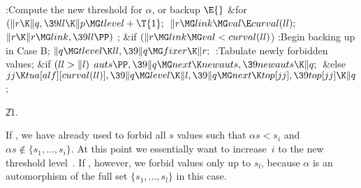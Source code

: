 \B{}:Compute the new threshold for $\alpha$, or backup%
\X${}\E{}$\6
\&{for} ${}(\|r\K\|q,\39\\{ll}\K\|p\MG\\{tlevel}+\T{1};{}$ ${}\|r\MG\\{link}\MG%
\\{val}\E\\{curval}(\\{ll});{}$ ${}\|r\K\|r\MG\\{link},\39\\{ll}\PP){}$\1\5
;\2\6
\&{if} ${}(\|r\MG\\{link}\MG\\{val}<\\{curval}(\\{ll}){}$)\1\6
:Begin backing up in Case B\X;\2\6
${}\|q\MG\\{tlevel}\K\\{ll},\39\|q\MG\\{fixer}\K\|r;{}$\6
:Tabulate newly forbidden values\X;\6
\&{if} ${}(\\{ll}>\|l){}$\1\5
${}\\{auts}\PP,\39\|q\MG\\{next}\K\\{newauts},\39\\{newauts}\K\|q;{}$\2\6
\&{else}\1\5
${}\\{jj}\K\\{tua}[\\{alf}][\\{curval}(\\{ll})],\39\|q\MG\\{level}\K\|l,\39\|q%
\MG\\{next}\K\\{top}[\\{jj}],\39\\{top}[\\{jj}]\K\|q{}$;\2\par
\U21.\fi

If , we have already used  to forbid all $s$ values
such that $\alpha s<s_i$ and $\alpha s\notin\{s_1,\ldots,s_i\}$.
At this point we essentially want to increase~$i$ to the new threshold
level~. If , however, we forbid values only up to
$s_l$,
because $\alpha$ is an automorphism of the full set $\{s_1,\ldots,s_l\}$
in this case.

